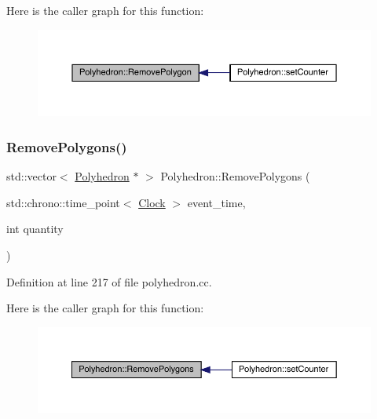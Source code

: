 Here is the caller graph for this function\+:
\nopagebreak
\begin{figure}[H]
\begin{center}
\leavevmode
\includegraphics[width=350pt]{class_polyhedron_a3b411fa617291a2a2d5df92b819285b4_icgraph}
\end{center}
\end{figure}
\mbox{\label{class_polyhedron_a5c2639b21aec25b76449fdf4c209aad1}} 
\subsubsection{\texorpdfstring{Remove\+Polygons()}{RemovePolygons()}}
{\footnotesize\ttfamily std\+::vector$<$ \hyperlink{class_polyhedron}{Polyhedron} $\ast$ $>$ Polyhedron\+::\+Remove\+Polygons (\begin{DoxyParamCaption}\item[{std\+::chrono\+::time\+\_\+point$<$ \hyperlink{universe_8h_a0ef8d951d1ca5ab3cfaf7ab4c7a6fd80}{Clock} $>$}]{event\+\_\+time,  }\item[{int}]{quantity }\end{DoxyParamCaption})}



Definition at line 217 of file polyhedron.\+cc.

Here is the caller graph for this function\+:
\nopagebreak
\begin{figure}[H]
\begin{center}
\leavevmode
\includegraphics[width=350pt]{class_polyhedron_a5c2639b21aec25b76449fdf4c209aad1_icgraph}
\end{center}
\end{figure}
\mbox{\label{class_polyhedron_ae90c347cfb8ca8028a260e88bef2b45c}} 
